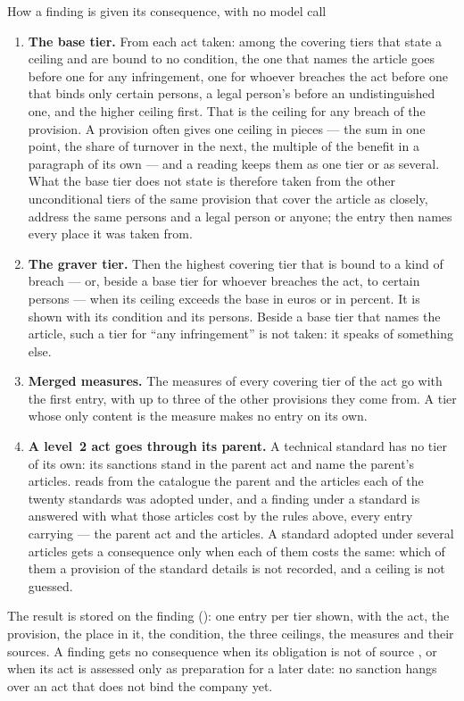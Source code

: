 \begin{codebox}{How a finding is given its consequence, with no model call}
\begin{enumerate}
    that other act is among the acts this report assesses for this company. Of several such
    acts, the one with the highest ceiling is taken.
  \item \textbf{The base tier.} From each act taken: among the covering tiers that state a
    ceiling and are bound to no condition, the one that names the article goes before one for
    any infringement, one for whoever breaches the act before one that binds only certain
    persons, a legal person's before an undistinguished one, and the higher ceiling first.
    That is the ceiling for any breach of the provision. A provision often gives one ceiling
    in pieces --- the sum in one point, the share of turnover in the next, the multiple of
    the benefit in a paragraph of its own --- and a reading keeps them as one tier or as
    several. What the base tier does not state is therefore taken from the other
    unconditional tiers of the same provision that cover the article as closely, address the
    same persons and a legal person or anyone; the entry then names every place it was taken
    from.
  \item \textbf{The graver tier.} Then the highest covering tier that is bound to a kind of
    breach --- or, beside a base tier for whoever breaches the act, to certain persons ---
    when its ceiling exceeds the base in euros or in percent. It is shown with its condition
    and its persons. Beside a base tier that names the article, such a tier for
    \enquote{any infringement} is not taken: it speaks of something else.
  \item \textbf{Merged measures.} The measures of every covering tier of the act go with the
    first entry, with up to three of the other provisions they come from. A tier whose only
    content is the measure  makes no entry on its own.
  \item \textbf{A level~2 act goes through its parent.} A technical standard has no tier of
    its own: its sanctions stand in the parent act and name the parent's articles.
     reads from the catalogue the parent and the articles each of the
    twenty standards was adopted under, and a finding under a standard is answered with what
    those articles cost by the rules above, every entry carrying  --- the parent act
    and the articles. A standard adopted under several articles gets a consequence only when
    each of them costs the same: which of them a provision of the standard details is not
    recorded, and a ceiling is not guessed.
\end{enumerate}
The result is stored on the finding (): one entry per tier shown,
with the act, the provision, the place in it, the condition, the three ceilings, the measures
and their sources. A finding gets no consequence when its obligation is not of source
, or when its act is assessed only as preparation for a later date: no sanction
hangs over an act that does not bind the company yet.
\end{codebox}

